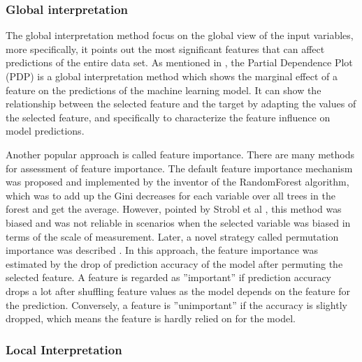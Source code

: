 \subsubsection{Global interpretation}

The global interpretation method focus on the global view of the input variables, more specifically, it points out the most significant features that can affect predictions of the entire data set. As mentioned in \cite{friedman2001greedy}, the Partial Dependence Plot (PDP) is a global interpretation method which shows the marginal effect of a feature on the predictions of the machine learning model. It can show the relationship between the selected feature and the target by adapting the values of the selected feature, and specifically to characterize the feature influence on model predictions. 

Another popular approach is called feature importance. There are many methods for assessment of feature importance. The default feature importance mechanism was proposed and implemented by the inventor of the RandomForest algorithm, which was to add up the Gini decreases for each variable over all trees in the forest and get the average. However, pointed by Strobl et al \cite{strobl2007bias}, this method was biased and was not reliable in scenarios when the selected variable was biased in terms of the scale of measurement. Later, a novel strategy called permutation importance was described \cite{fisher2018model}. In this approach, the feature importance was estimated by the drop of prediction accuracy of the model after permuting the selected feature. A feature is regarded as ”important” if prediction accuracy drops a lot after shuffling feature values as the model depends on the feature for the prediction. Conversely, a feature is ”unimportant” if the accuracy is slightly dropped, which means the feature is hardly relied on for the model.


\subsubsection{Local Interpretation}


